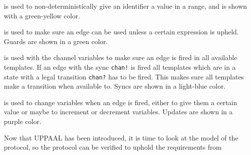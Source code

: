 \begin{description}[labelindent=\parindent,labelsep=1ex]
    \item[Select] is used to non-deterministically give an identifier a value in a range, and is shown with a green-yellow color.
    \item[Guard] is used to make sure an edge can be used unless a certain expression is upheld. Guards are shown in a green color.
    \item[Sync] is used with the channel variables to make sure an edge is fired in all available templates. If an edge with the sync \texttt{chan!} is fired all templates which are in a state with a legal transition \texttt{chan?} has to be fired. This makes sure all templates make a transition when available to. Syncs are shown in a light-blue color.
    \item[Update] is used to change variables when an edge is fired, either to give them a certain value or maybe to increment or decrement variables. Updates are shown in a purple color.
\end{description}

\noindent
Now that UPPAAL has been introduced, it is time to look at the model of the protocol, so the protocol can be verified to uphold the requirements from 

